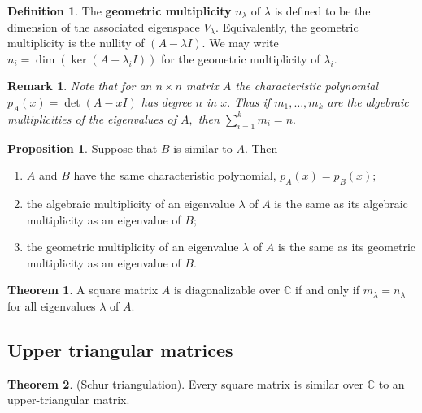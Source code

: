 \documentclass[12pt, a4paper]{article}
\newcommand{\bb}[1]{\mathbb{#1}}
\newtheorem*{remark}{Remark}
\theoremstyle{definition}
\newtheorem{definition}{Definition}[section]
\newtheorem{theorem}{Theorem}[section]
\newtheorem{proposition}{Proposition}
\theoremstyle{plain}
\begin{document}
\begin{definition}
The \textbf{geometric multiplicity} $n_\lambda$ of $\lambda$ is defined to be the dimension of the associated eigenspace $V_\lambda.$ Equivalently, the geometric multiplicity is the nullity of $(A -\lambda I ).$ We may write $n_i = \dim(\ker(A - \lambda_iI))$ for the geometric multiplicity of $\lambda_i.$
\end{definition}

\begin{remark}
Note that for an $n\times n$ matrix $A$ the characteristic polynomial $p_A(x) = \det(A-xI)$ has degree $n$ in $x.$ Thus if $m_1,\ldots,m_k$ are the algebraic multiplicities of the eigenvalues of $A,$ then $\sum_{i=1}^{k} m_i = n.$
\end{remark}

\begin{proposition}
Suppose that $B$ is similar to $A.$ Then

\begin{enumerate}
	
	\item $A$ and $B$ have the same characteristic polynomial, $p_A(x) = p_B(x);$

	\item the algebraic multiplicity of an eigenvalue $\lambda$ of $A$ is the same as its algebraic multiplicity as an eigenvalue of $B;$

	\item the geometric multiplicity of an eigenvalue $\lambda$ of $A$ is the same as its geometric multiplicity as an eigenvalue of $B.$

\end{enumerate}
\end{proposition}

\begin{theorem}
A square matrix $A$ is diagonalizable over $\bb{C}$ if and only if $m_\lambda = n_\lambda$ for all eigenvalues $\lambda$ of $A.$
\end{theorem}

\subsection{Upper triangular matrices}

\begin{theorem}
(Schur triangulation). Every square matrix is similar over $\bb{C}$ to an upper-triangular matrix.
\end{theorem}
\end{document}
